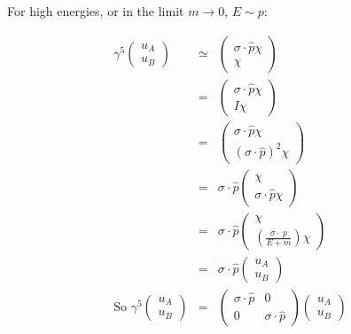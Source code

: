 For high energies, or in the limit $m \to 0$, $E \sim p$:

\begin{eqnarray*}
  \gamma^5
  \left(
    \begin{array}{c}
    u_A \\
    u_B
    \end{array}
  \right)
  & \simeq &
  \left(
    \begin{array}{c}
    \sigma\cdot\hat{p} \chi \\
    \chi
    \end{array}
  \right)
  \\
  & = &
  \left(
    \begin{array}{c}
    \sigma\cdot\hat{p}\chi \\
    I\chi
    \end{array}
  \right)
  \\
  & = & 
  \left(
    \begin{array}{c}
    \sigma\cdot\hat{p}\chi \\
    \left(\sigma\cdot\hat{p}\right)^2\chi
    \end{array}
  \right)
  \\
  & = &
  \sigma\cdot\hat{p}
  \left(
    \begin{array}{c}
    \chi \\
    \sigma\cdot\hat{p}\chi
    \end{array}
  \right)
  \\
  & = &
  \sigma\cdot\hat{p}
  \left(
    \begin{array}{c}
      \chi \\
      \left(\frac{\sigma\cdot\ p}{E + m}\right)\chi
    \end{array}
  \right)
  \\
  & = &
  \sigma\cdot\hat{p}
  \left(
    \begin{array}{c}
    u_A \\
    u_B
    \end{array}
  \right)
  \\
  \textrm{So }\gamma^5
  \left(
    \begin{array}{c}
    u_A \\
    u_B
    \end{array}
  \right)
  & = &
  \left(
    \begin{array}{cc}
    \sigma\cdot\hat{p} & 0 \\
    0 & \sigma\cdot\hat{p}
    \end{array}
  \right)
  \left(
    \begin{array}{c}
    u_A \\
    u_B
    \end{array}
  \right)
\end{eqnarray*}

